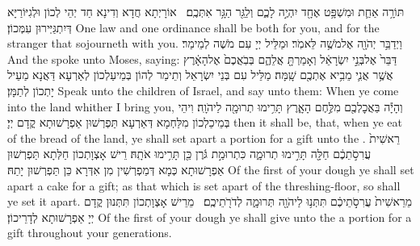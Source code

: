 {תּוֹרָ֥ה אַחַ֛ת וּמִשְׁפָּ֥ט אֶחָ֖ד יִהְיֶ֣ה לָכֶ֑ם וְלַגֵּ֖ר הַגָּ֥ר אִתְּכֶֽם׃ \petucha }
{אוֹרָיְתָא חֲדָא וְדִינָא חַד יְהֵי לְכוֹן וּלְגִיּוֹרַיָּא דְּיִתְגַּיְּירוּן עִמְּכוֹן׃}
{One law and one ordinance shall be both for you, and for the stranger that sojourneth with you.}{}
{וַיְדַבֵּ֥ר יְהֹוָ֖ה אֶל\maqqaf מֹשֶׁ֥ה לֵּאמֹֽר׃}
{וּמַלֵּיל יְיָ עִם מֹשֶׁה לְמֵימַר׃}
{And the \lord\space spoke unto Moses, saying:}{}
{דַּבֵּר֙ אֶל\maqqaf בְּנֵ֣י יִשְׂרָאֵ֔ל וְאָמַרְתָּ֖ אֲלֵהֶ֑ם בְּבֹֽאֲכֶם֙ אֶל\maqqaf הָאָ֔רֶץ אֲשֶׁ֥ר אֲנִ֛י מֵבִ֥יא אֶתְכֶ֖ם שָֽׁמָּה׃}
{מַלֵּיל עִם בְּנֵי יִשְׂרָאֵל וְתֵימַר לְהוֹן בְּמֵיעַלְכוֹן לְאַרְעָא דַּאֲנָא מַעֵיל יָתְכוֹן לְתַמָּן׃}
{Speak unto the children of Israel, and say unto them: When ye come into the land whither I bring you,}{}
{וְהָיָ֕ה בַּאֲכׇלְכֶ֖ם מִלֶּ֣חֶם הָאָ֑רֶץ תָּרִ֥ימוּ תְרוּמָ֖ה לַיהֹוָֽה׃}
{וִיהֵי בְּמֵיכַלְכוֹן מִלַּחְמָא דְּאַרְעָא תַּפְרְשׁוּן אַפְרָשׁוּתָא קֳדָם יְיָ׃}
{then it shall be, that, when ye eat of the bread of the land, ye shall set apart a portion for a gift unto the \lord.}{}
{רֵאשִׁית֙ עֲרִסֹ֣תֵכֶ֔ם חַלָּ֖ה תָּרִ֣ימוּ תְרוּמָ֑ה כִּתְרוּמַ֣ת גֹּ֔רֶן כֵּ֖ן תָּרִ֥ימוּ אֹתָֽהּ׃}
{רֵישׁ אָצְוָתְכוֹן חַלְּתָא תַּפְרְשׁוּן אַפְרָשׁוּתָא כְּמָא דְּמַפְרְשִׁין מִן אִדְּרָא כֵּן תַּפְרְשׁוּן יָתַהּ׃}
{Of the first of your dough ye shall set apart a cake for a gift; as that which is set apart of the threshing-floor, so shall ye set it apart.}{}
{מֵרֵאשִׁית֙ עֲרִסֹ֣תֵיכֶ֔ם תִּתְּנ֥וּ לַיהֹוָ֖ה תְּרוּמָ֑ה לְדֹרֹ֖תֵיכֶֽם׃ \setuma }
{מֵרֵישׁ אָצְוָתְכוֹן תִּתְּנוּן קֳדָם יְיָ אַפְרָשׁוּתָא לְדָרֵיכוֹן׃}
{Of the first of your dough ye shall give unto the \lord\space a portion for a gift throughout your generations.}{}
